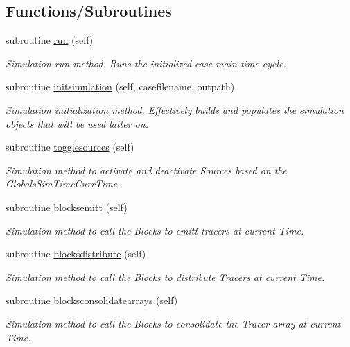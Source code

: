 \subsection*{Functions/\+Subroutines}
\begin{DoxyCompactItemize}
\item 
subroutine \mbox{\hyperlink{namespacesimulation__mod_a73bd78c4ac76c51f1e10f5847c25c4df}{run}} (self)
\begin{DoxyCompactList}\small\item\em Simulation run method. Runs the initialized case main time cycle. \end{DoxyCompactList}\item 
subroutine \mbox{\hyperlink{namespacesimulation__mod_aedbba2bb458cbcd7eb93938a5f7b5940}{initsimulation}} (self, casefilename, outpath)
\begin{DoxyCompactList}\small\item\em Simulation initialization method. Effectively builds and populates the simulation objects that will be used latter on. \end{DoxyCompactList}\item 
subroutine \mbox{\hyperlink{namespacesimulation__mod_a87a5141e4516b9610a6e4f0d2ff2d719}{togglesources}} (self)
\begin{DoxyCompactList}\small\item\em Simulation method to activate and deactivate Sources based on the GlobalsSim\+TimeCurr\+Time. \end{DoxyCompactList}\item 
subroutine \mbox{\hyperlink{namespacesimulation__mod_a13aa0745f4601e3f418143dab2f18276}{blocksemitt}} (self)
\begin{DoxyCompactList}\small\item\em Simulation method to call the Blocks to emitt tracers at current Time. \end{DoxyCompactList}\item 
subroutine \mbox{\hyperlink{namespacesimulation__mod_a058892630af07fc0fe8a4bffec531c6a}{blocksdistribute}} (self)
\begin{DoxyCompactList}\small\item\em Simulation method to call the Blocks to distribute Tracers at current Time. \end{DoxyCompactList}\item 
subroutine \mbox{\hyperlink{namespacesimulation__mod_ac838d4afe33303dc49a5790ca957baa1}{blocksconsolidatearrays}} (self)
\begin{DoxyCompactList}\small\item\em Simulation method to call the Blocks to consolidate the Tracer array at current Time. \end{DoxyCompactList}\item 

\end{DoxyCompactItemize}
